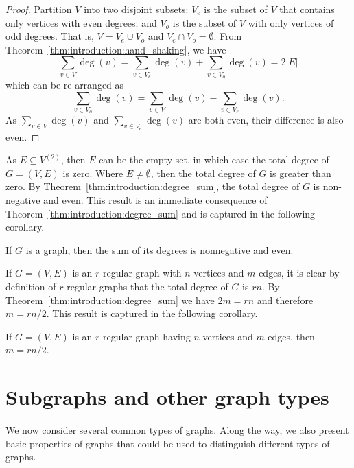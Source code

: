 \begin{proof}
Partition $V$ into two disjoint subsets: $V_e$ is the subset of $V$
that contains only vertices with even degrees; and $V_o$ is the subset
of $V$ with only vertices of odd degrees. That is, $V = V_e \cup V_o$
and $V_e \cap V_o = \emptyset$. From
Theorem~\ref{thm:introduction:hand_shaking}, we have
\[
\sum_{v \in V} \deg(v)
=
\sum_{v \in V_e} \deg(v) + \sum_{v \in V_o} \deg(v)
=
2 |E|
\]
which can be re-arranged as
\[
\sum_{v \in V_o} \deg(v)
=
\sum_{v \in V} \deg(v) - \sum_{v \in V_e} \deg(v).
\]
As $\sum_{v \in V} \deg(v)$ and $\sum_{v \in V_e} \deg(v)$ are both
even, their difference is also even.
\end{proof}

As $E \subseteq V^{(2)}$, then $E$ can be the empty set, in which
case the total degree of $G = (V, E)$ is zero. Where $E \neq
\emptyset$, then the total degree of $G$ is greater than zero. By
Theorem~\ref{thm:introduction:degree_sum}, the total degree of $G$ is
non-negative and even. This result is an immediate consequence of
Theorem~\ref{thm:introduction:degree_sum} and is captured in the
following corollary.

\begin{corollary}
\label{cor:introduction:degree_sum_even}
If $G$ is a graph, then the sum of its degrees is nonnegative
and even.
\end{corollary}

If $G = (V, E)$ is an $r$-regular graph with $n$ vertices and $m$
edges, it is clear by definition of $r$-regular graphs that the total
degree of $G$ is $rn$. By Theorem~\ref{thm:introduction:degree_sum} we
have $2m = rn$ and therefore $m = rn / 2$. This result is captured in
the following corollary.

\begin{corollary}
If $G = (V, E)$ is an $r$-regular graph having $n$ vertices and $m$
edges, then $m = rn / 2$.
\end{corollary}



\section{Subgraphs and other graph types}
\label{sec:introduction:subgraphs_graph_types}

We now consider several common types of graphs. Along the way, we also
present basic properties of graphs that could be used to distinguish
different types of graphs.

